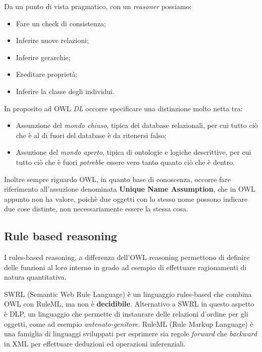 \documentclass[11pt]{article}
\begin{document}
Da un punto di vista pragmatico, con un \textit{reasoner} possiamo:
\begin{itemize}
\item Fare un check di consistenza;
\item Inferire nuove relazioni;
\item Inferire gerarchie;
\item Ereditare proprietà;
\item Inferire la classe degli individui.
\end{itemize}
In proposito ad OWL \textit{DL} occorre specificare una distinzione molto netta tra:
\begin{itemize}
\item Assunzione del \textit{mondo chiuso}, tipica dei database relazionali, per cui tutto ciò che è al di fuori del database è da ritenersi falso;
\item Assuzione del \textit{mondo aperto}, tipica di ontologie e logiche descrittive, per cui tutto ciò che è fuori \textit{potrebbe} essere vero tanto quanto ciò che è dentro.
\end{itemize}
Inoltre sempre riguardo OWL, in quanto base di conoscenza, occorre fare riferimento all'assuzione denominata \textbf{Unique Name Assumption}, che in OWL appunto non ha valore, poichè due oggetti con lo stesso nome possono indicare due cose distinte, non necessariamente essere la stessa cosa.

\subsection{Rule based reasoning}
I rules-based reasoning, a differenza dell'OWL reasoning permettono di definire delle funzioni al loro interno in grado ad esempio di effettuare ragionamenti di natura quantitativa. 

SWRL (Semantic Web Rule Language) è un linguaggio rules-based che combina OWL con RuleML, ma non è \textbf{decidibile}.
Alternativo a SWRL in questo aspetto è DLP, un linguaggio che permette di instaurare delle relazioni d'ordine per gli oggetti, come ad esempio \textit{antenato-genitore}.
RuleML (Rule Markup Language) è una famiglia di linguaggi sviluppati per esprimere sia regole \textit{forward} che \textit{backward} in XML per effettuare deduzioni ed operazioni inferenziali.


\end{document}
